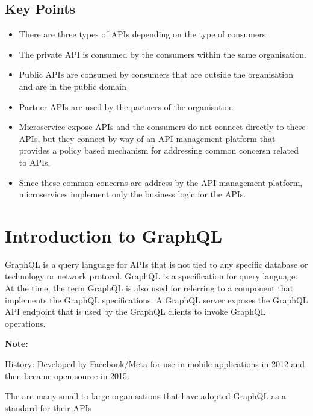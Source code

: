 \documentclass[a4paper, 11pt]{book}
\newenvironment{note}{
    \begin{siderule}
        \textbf{Note: }
        }{
    \end{siderule}
}
\begin{document}
    \subsection{Key Points}
    \begin{itemize}
        \item There are three types of APIs depending on the type of consumers
        \item The private API is consumed by the consumers within the same organisation.
        \item Public APIs are consumed by consumers that are outside the organisation and are in the public domain
        \item Partner APIs are used by the partners of the organisation
        \item Microservice expose APIs and the consumers do not connect directly to these APIs, but they connect by way of an API management platform that provides a policy based mechanism for addressing common concersn related to APIs.
        \item Since these common concerns are address by the API management platform, microservices implement only the business logic for the APIs.
    \end{itemize}



    \section{Introduction to GraphQL}

    GraphQL is a query language for APIs that is not tied to any specific database or technology or network protocol.
    GraphQL is a specification for query language.
    At the time, the term GraphQL is also used for referring to a component that implements the GraphQL specifications.
    A GraphQL server exposes the GraphQL API endpoint that is used by the GraphQL clients to invoke GraphQL operations.

    \begin{note}
        History: Developed by Facebook/Meta for use in mobile applications in 2012 and then became open source in 2015.
    \end{note}

    The are many small to large organisations that have adopted GraphQL as a standard for their APIs
\end{document}
